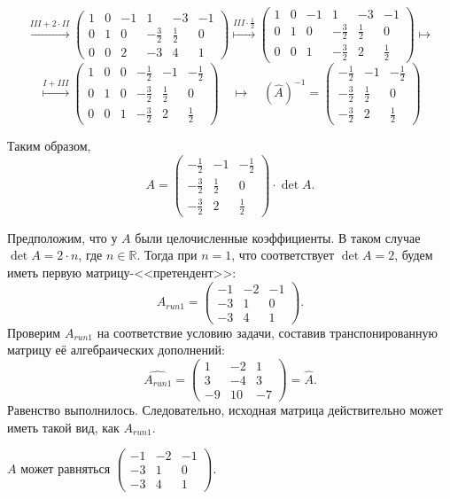 \documentclass[a4paper,12pt]{article}
\begin{document}
$$
\overset{III + 2 \cdot II}{\longmapsto}
\left(\begin{array}{ccc|ccc}
1 & 0 & -1 & 1 & -3 & -1\\
0 & 1 & 0 & -\frac{3}{2} & \frac{1}{2} & 0\\
0 & 0 & 2 & -3 & 4 & 1
\end{array} \right)
\overset{III \cdot \frac{1}{2}}{\longmapsto}
\left(\begin{array}{ccc|ccc}
1 & 0 & -1 & 1 & -3 & -1\\
0 & 1 & 0 & -\frac{3}{2} & \frac{1}{2} & 0\\
0 & 0 & 1 & -\frac{3}{2} & 2 & \frac{1}{2}
\end{array} \right)
\longmapsto
$$
$$
\overset{I + III}{\longmapsto}
\left(\begin{array}{ccc|ccc}
1 & 0 & 0 & -\frac{1}{2} & -1 & -\frac{1}{2}\\
0 & 1 & 0 & -\frac{3}{2} & \frac{1}{2} & 0\\
0 & 0 & 1 & -\frac{3}{2} & 2 & \frac{1}{2}
\end{array} \right)
\quad
\longmapsto \quad
(\widehat A)^{-1} = 
\begin{pmatrix}
-\frac{1}{2} & -1 & -\frac{1}{2}\\
-\frac{3}{2} & \frac{1}{2} & 0\\
-\frac{3}{2} & 2 & \frac{1}{2}
\end{pmatrix}
$$\par
Таким образом,
$$A = \begin{pmatrix}
-\frac{1}{2} & -1 & -\frac{1}{2}\\
-\frac{3}{2} & \frac{1}{2} & 0\\
-\frac{3}{2} & 2 & \frac{1}{2}
\end{pmatrix}
\cdot \det A.$$\par
Предположим, что у $A$ были целочисленные коэффициенты. В таком случае  $\det A = 2 \cdot n$, где $n \in \mathbb{R}$. Тогда при $n=1$, что соответствует $\det A = 2$, будем иметь первую матрицу-<<претендент>>:
$$A_{run1} = \begin{pmatrix}
- 1 & -2 & -1\\
-3 & 1 & 0\\
-3 & 4 & 1
\end{pmatrix}.$$
Проверим $A_{run1}$ на соответствие условию задачи, составив транспонированную матрицу её алгебраических дополнений:
$$\widehat{A_{run1}} =
\begin{pmatrix}
1 & -2 & 1\\
3 & -4 & 3\\
-9 & 10 & -7
\end{pmatrix}
= \widehat{A}.$$
Равенство выполнилось. Следовательно, исходная матрица действительно может иметь такой вид, как  $A_{run1}$.\par
\vspace{10pt}
 $A$ может равняться $\left(
\begin{smallmatrix}
- 1 & -2 & -1\\
-3 & 1 & 0\\
-3 & 4 & 1
\end{smallmatrix}
\right)
$.
\end{document}

